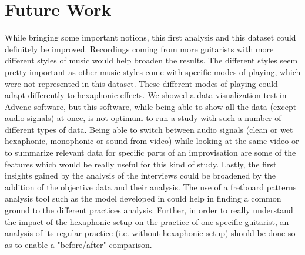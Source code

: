 \documentclass{article}
\begin{document}
\section{Future Work}\label{sec:future_work}

While bringing some important notions, this first analysis and this dataset could definitely be improved. Recordings coming from more guitarists with more different styles of music would help broaden the results. The different styles seem pretty important as other music styles come with specific modes of playing, which were not represented in this dataset. These different modes of playing could adapt differently to hexaphonic effects.
We showed a data visualization test in Advene software, but this software, while being able to show all the data (except audio signals) at once, is not optimum to run a study with such a number of different types of data.  Being able to switch between audio signals (clean or wet hexaphonic, monophonic or sound from video) while looking at the same video or to summarize relevant data for specific parts of an improvisation are some of the features which would be really useful for this kind of study.
Lastly, the first insights gained by the analysis of the interviews could be broadened by the addition of the objective data and their analysis. The use of a fretboard patterns analysis tool such as the model developed in \cite{musico:deSouza2018_fretboard} could help in finding a common ground to the different practices analysis. Further, in order to really understand the impact of the hexaphonic setup on the practice of one specific guitarist, an analysis of its regular practice (i.e. without hexaphonic setup) should be done so as to enable a "before/after" comparison.
\end{document}
